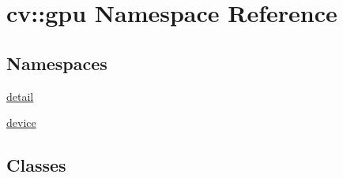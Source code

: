 \hypertarget{namespacecv_1_1gpu}{\section{cv\-:\-:gpu Namespace Reference}
\label{namespacecv_1_1gpu}
}
\subsection*{Namespaces}
\begin{DoxyCompactItemize}
\item 
\hyperlink{namespacecv_1_1gpu_1_1detail}{detail}
\item 
\hyperlink{namespacecv_1_1gpu_1_1device}{device}
\end{DoxyCompactItemize}
\subsection*{Classes}
